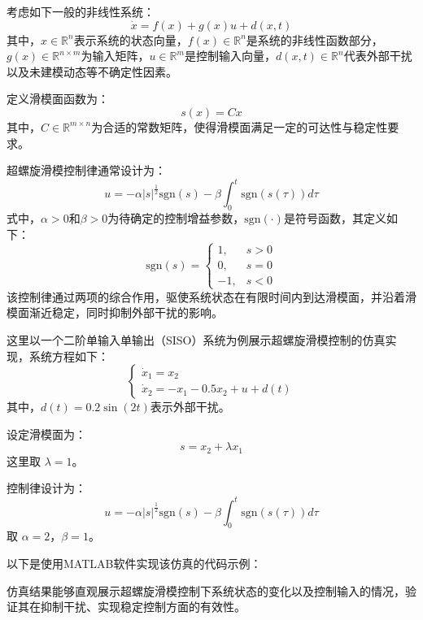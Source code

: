 考虑如下一般的非线性系统：
\begin{equation}
	\dot{x} = f(x) + g(x)u + d(x,t)
\end{equation}
其中，$x\in \mathbb{R}^{n}$表示系统的状态向量，$f(x)\in \mathbb{R}^{n}$是系统的非线性函数部分，$g(x)\in \mathbb{R}^{n\times m}$为输入矩阵，$u\in \mathbb{R}^{m}$是控制输入向量，$d(x,t)\in \mathbb{R}^{n}$代表外部干扰以及未建模动态等不确定性因素。

定义滑模面函数为：
\begin{equation}
	s(x) = Cx
\end{equation}
其中，$C\in \mathbb{R}^{m\times n}$为合适的常数矩阵，使得滑模面满足一定的可达性与稳定性要求。

超螺旋滑模控制律通常设计为：
\begin{equation}
	u = -\alpha \vert s \vert^{\frac{1}{2}} \text{sgn}(s) - \beta \int_{0}^{t} \text{sgn}(s(\tau))d\tau
\end{equation}
式中，$\alpha > 0$和$\beta > 0$为待确定的控制增益参数，$\text{sgn}(\cdot)$是符号函数，其定义如下：
\[
\text{sgn}(s)=\left\{
\begin{array}{ll}
	1, & s > 0 \\
	0, & s = 0 \\
	-1, & s < 0
\end{array}
\right.
\]
该控制律通过两项的综合作用，驱使系统状态在有限时间内到达滑模面，并沿着滑模面渐近稳定，同时抑制外部干扰的影响。

这里以一个二阶单输入单输出（SISO）系统为例展示超螺旋滑模控制的仿真实现，系统方程如下：
\begin{equation}
	\begin{cases}
		\dot{x}_{1} = x_{2} \\
		\dot{x}_{2} = -x_{1} - 0.5x_{2} + u + d(t)
	\end{cases}
\end{equation}
其中，$d(t) = 0.2\sin(2t)$表示外部干扰。

设定滑模面为：
\begin{equation}
	s = x_{2} + \lambda x_{1}
\end{equation}
这里取 $\lambda = 1$。

控制律设计为：
\begin{equation}
	u = -\alpha \vert s \vert^{\frac{1}{2}} \text{sgn}(s) - \beta \int_{0}^{t} \text{sgn}(s(\tau))d\tau
\end{equation}
取 $\alpha = 2$，$\beta = 1$。

以下是使用MATLAB软件实现该仿真的代码示例：

仿真结果能够直观展示超螺旋滑模控制下系统状态的变化以及控制输入的情况，验证其在抑制干扰、实现稳定控制方面的有效性。